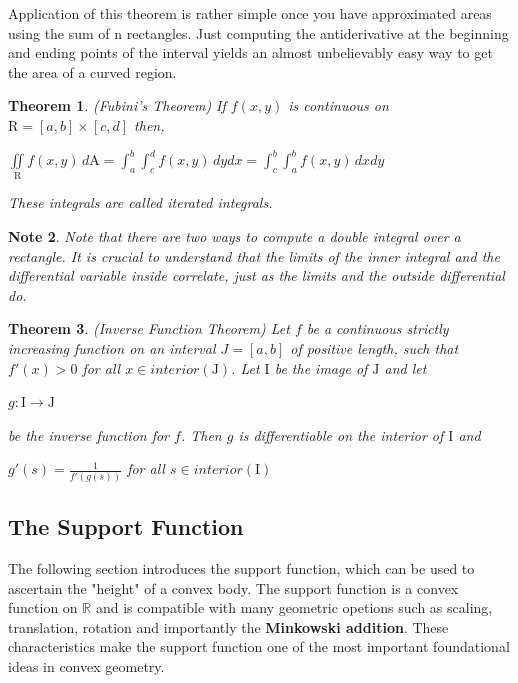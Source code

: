 \documentclass[a4paper]{book}
\newtheorem{theorem}{Theorem}%
\newtheorem{note}[theorem]{Note}%
\numberwithin{theorem}{section}%
\begin{document}
Application of this theorem is rather simple once you have approximated areas using the sum of n rectangles. Just computing the antiderivative at the beginning and ending points of the interval yields an almost unbelievably easy way to get the area of a curved region.

\begin{theorem} (Fubini's Theorem)
    If $f(x,y)$ is continuous on $\displaystyle \mathrm{R}=[a,b]\times[c,d]$ then,
    \begin{center}
        $\displaystyle \underset{\mathrm{R}}{\iint}f(x,y)\,d\mathrm{A}=\int_{a}^{b}\int_{c}^{d}f(x,y)\,dydx=\int_{c}^{b}\int_{a}^{b}f(x,y)\,dxdy$
    \end{center}
    These integrals are called iterated integrals.
\end{theorem}

\begin{note}
    Note that there are two ways to compute a double integral over a rectangle. It is crucial to understand that the limits of the inner integral and the differential variable inside correlate, just as the limits and the outside differential do.
\end{note}

\begin{theorem} (Inverse Function Theorem)
    Let $f$ be a continuous strictly increasing function on an interval $J=[a,b]$ of positive length, such that $f'(x)>0$ for all $x\in interior(\mathrm{J})$. Let $\mathrm{I}$ be the image of $\mathrm{J}$ and let
    \begin{center}
        $\displaystyle g:\mathrm{I}\to\mathrm{J}$
    \end{center}
    be the inverse function for $f$. Then $g$ is differentiable on the interior of $\mathrm{I}$ and
    \begin{center}
        $\displaystyle g'(s)=\frac{1}{f'(g(s))}$ for all $s\in interior(\mathrm{I})$
    \end{center}
\end{theorem}

\subsection{The Support Function}
The following section introduces the support function, which can be used to ascertain the "height" of a convex body. The support function is a convex function on $\mathbb{R}$ and is compatible with many geometric opetions such as scaling, translation, rotation and importantly the \textbf{Minkowski addition}. These characteristics make the support function one of the most important foundational ideas in convex geometry.~\citep{gehring2019isoperimetric}
\end{document}
